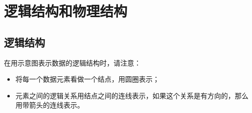 \section{逻辑结构和物理结构}

\subsection{逻辑结构}
\begin{frame}
  
\end{frame}

\begin{frame}
  
\end{frame}

\begin{frame}
  
\end{frame}

\begin{frame}
  
\end{frame}

\begin{frame}
  
\end{frame}

\begin{frame}
  在用示意图表示数据的逻辑结构时，请注意： \vspace{0.1in}
  
  \begin{itemize}
  \item 将每一个数据元素看做一个结点，用圆圈表示；\\[0.1in]
  \item 元素之间的逻辑关系用结点之间的连线表示，如果这个关系是有方向的，那么用带箭头的连线表示。
  \end{itemize}
  \pause

  \begin{figure}    
    \centering

  \end{figure}

\end{frame}


